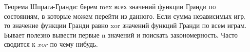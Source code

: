 Теорема Шпрага-Гранди: берем mex всех значений функции Гранди по состояниям, в которые можем перейти из данного.
Если сумма независимых игр, то значение функции Гранди равно xor значений функций Гранди по всем играм.
Бывает полезно вывести первые n значений и поискать закономерность.
Часто сводится к $xor$ по чему-нибудь.
